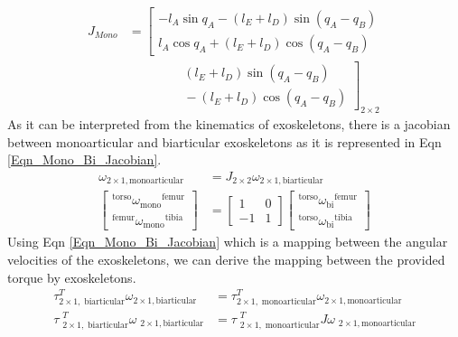 \documentclass[10pt,letterpaper]{article}
\begin{document}
\begin{equation}\label{Eqn_Mono_Jacobian}
\begin{aligned}
J_{Mono}&=
\left[\begin{matrix}
-l_{A}\sin{q_{A}}- (l_ {E} + l_ {D})\sin (q_ {A} - q_ {B})\\
l_{A}\cos{q_{A}} + (l_{E} + l_{D})\cos (q_{A} - q_ {B})
\end{matrix}\right.\\
&\qquad\qquad
\left.\begin{matrix}
{} (l_ {E} + l_ {D})\sin (q_ {A} - q_ {B})\\
{} - (l_ {E} + l_ {D})\cos (q_ {A} - q_ {B})
\end{matrix}\right]_{2\times 2}
\end{aligned}
\end{equation}
As it can be interpreted from the kinematics of exoskeletons, there is a jacobian between monoarticular and biarticular exoskeletons as it is represented in Eqn \ref{Eqn_Mono_Bi_Jacobian}.
\begin{equation}\label{Eqn_Mono_Bi_Jacobian}
\begin{aligned}
\omega_{2\times 1, \mathrm{monoarticular}} &= J_{2\times 2}\omega_{2\times 1, \mathrm{biarticular}}\\
\left\lbrack \begin{array}{c}
{}^{\mathrm{torso}} {\omega_{\mathrm{mono}} }^{\mathrm{femur}} \\
{}^{\mathrm{femur}} {\omega_{\mathrm{mono}} }^{\mathrm{tibia}} 
\end{array}\right\rbrack &=\left\lbrack \begin{array}{cc}
1 & 0\\
-1 & 1
\end{array}\right\rbrack \left\lbrack \begin{array}{c}
{}^{\mathrm{torso}} {\omega_{\mathrm{bi}} }^{\mathrm{femur}} \\
{}^{\mathrm{torso}} {\omega_{\mathrm{bi}} }^{\mathrm{tibia}} 
\end{array}\right\rbrack
\end{aligned}
\end{equation}
Using Eqn \ref{Eqn_Mono_Bi_Jacobian} which is a mapping between the angular velocities of the exoskeletons, we can derive the mapping between the provided torque by exoskeletons.
\begin{equation*}
\begin{aligned}
\tau{}_{2\times 1,\;\mathrm{biarticular}}^T \omega {}_{2\times 1,\mathrm{biarticular}} &=\tau {}_{2\times 1,\;\mathrm{monoarticular}}^T \omega {}_{2\times 1,\mathrm{monoarticular}}\\
\tau {\;}_{2\times 1,\;\mathrm{biarticular}}^T \omega {\;}_{2\times 1,\mathrm{biarticular}} &=\tau {\;}_{2\times 1,\;\mathrm{monoarticular}}^T J\omega {\;}_{2\times 1,\mathrm{monoarticular}}\\
\end{aligned}
\end{equation*}
\end{document}
